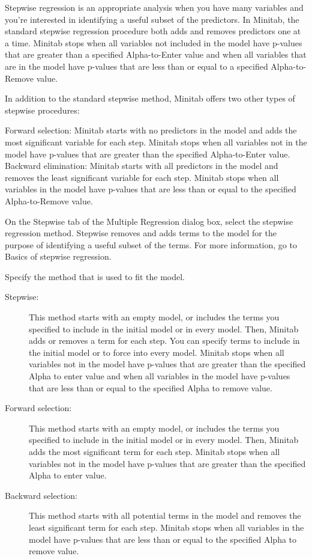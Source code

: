 Stepwise regression is an appropriate analysis when you have many variables and you’re interested in identifying a useful subset of the predictors. In Minitab, the standard stepwise regression procedure both adds and removes predictors one at a time. Minitab stops when all variables not included in the model have p-values that are greater than a specified Alpha-to-Enter value and when all variables that are in the model have p-values that are less than or equal to a specified Alpha-to-Remove value.

In addition to the standard stepwise method, Minitab offers two other types of stepwise procedures:

Forward selection:  Minitab starts with no predictors in the model and adds the most significant variable for each step. Minitab stops when all variables not in the model have p-values that are greater than the specified Alpha-to-Enter value.
Backward elimination:  Minitab starts with all predictors in the model and removes the least significant variable for each step. Minitab stops when all variables in the model have p-values that are less than or equal to the specified Alpha-to-Remove value.


On the Stepwise tab of the Multiple Regression dialog box, select the stepwise regression method.
Stepwise removes and adds terms to the model for the purpose of identifying a useful subset of the terms. For more information, go to Basics of stepwise regression.

Specify the method that is used to fit the model.
\begin{description}
	\item[Stepwise:] This method starts with an empty model, or includes the terms you specified to include in the initial model or in every model. Then, Minitab adds or removes a term for each step. You can specify terms to include in the initial model or to force into every model. Minitab stops when all variables not in the model have p-values that are greater than the specified Alpha to enter value and when all variables in the model have p-values that are less than or equal to the specified Alpha to remove value.
	\item[Forward selection:] This method starts with an empty model, or includes the terms you specified to include in the initial model or in every model. Then, Minitab adds the most significant term for each step. Minitab stops when all variables not in the model have p-values that are greater than the specified Alpha to enter value.
	\item[Backward selection:] This method starts with all potential terms in the model and removes the least significant term for each step. Minitab stops when all variables in the model have p-values that are less than or equal to the specified Alpha to remove value.
\end{description}


